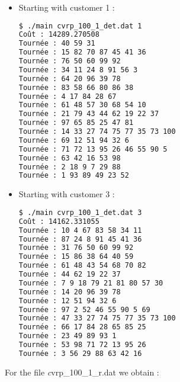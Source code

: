 \begin{itemize}
\item Starting with customer 1 :

\begin{lstlisting}[language=bash, frame=shadowbox]
$ ./main cvrp_100_1_det.dat 1
Coût : 14289.270508
Tournée : 40 59 31
Tournée : 15 82 70 87 45 41 36
Tournée : 76 50 60 99 92
Tournée : 34 11 24 8 91 56 3
Tournée : 64 20 96 39 78
Tournée : 83 58 66 80 86 38
Tournée : 4 17 84 28 67
Tournée : 61 48 57 30 68 54 10
Tournée : 21 79 43 44 62 19 22 37
Tournée : 97 65 85 25 47 81
Tournée : 14 33 27 74 75 77 35 73 100
Tournée : 69 12 51 94 32 6
Tournée : 71 72 13 95 26 46 55 90 5
Tournée : 63 42 16 53 98
Tournée : 2 18 9 7 29 88
Tournée : 1 93 89 49 23 52
\end{lstlisting}

\item Starting with customer 3 :

\begin{lstlisting}[language=bash, frame=shadowbox]
$ ./main cvrp_100_1_det.dat 3
Coût : 14162.331055
Tournée : 10 4 67 83 58 34 11
Tournée : 87 24 8 91 45 41 36
Tournée : 31 76 50 60 99 92
Tournée : 15 86 38 64 40 59
Tournée : 61 48 43 54 68 70 82
Tournée : 44 62 19 22 37
Tournée : 7 9 18 79 21 81 80 57 30
Tournée : 14 20 96 39 78
Tournée : 12 51 94 32 6
Tournée : 97 2 52 46 55 90 5 69
Tournée : 47 33 27 74 75 77 35 73 100
Tournée : 66 17 84 28 65 85 25
Tournée : 23 49 89 93 1
Tournée : 53 98 71 72 13 95 26
Tournée : 3 56 29 88 63 42 16
\end{lstlisting}
\end{itemize}

For the file {\textit cvrp\_100\_1\_r.dat} we obtain :

